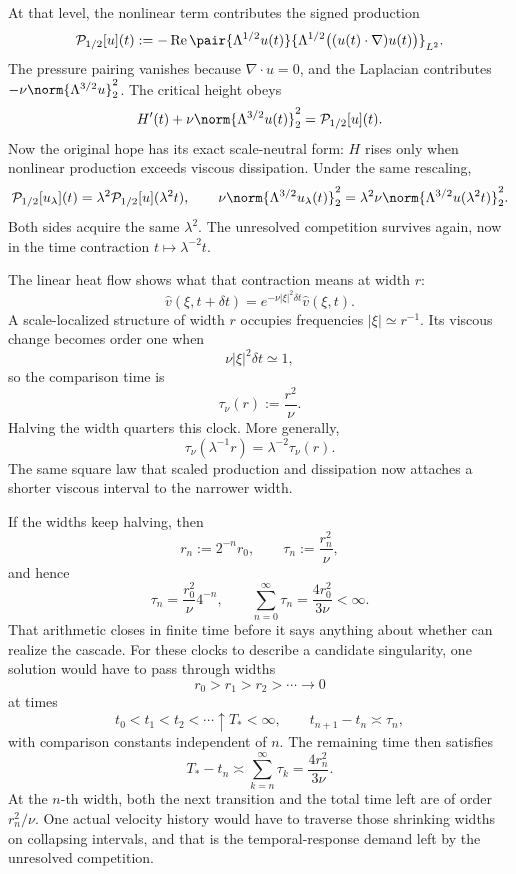 
At that level, the nonlinear term contributes the signed production
\[
  \mathcal P_{1/2}[u](t)
  :=
  -\operatorname{Re}
  \pair
    {\Lambda^{1/2}u(t)}
    {\Lambda^{1/2}\bigl((u(t)\cdot\nabla)u(t)\bigr)}_{L^2}.
\]
The pressure pairing vanishes because \(\nabla\cdot u=0\), and the Laplacian contributes \(-\nu\norm{\Lambda^{3/2}u}_2^2\). The critical height obeys
\[
  H'(t)
  +
  \nu\norm{\Lambda^{3/2}u(t)}_2^2
  =
  \mathcal P_{1/2}[u](t).
\]
Now the original hope has its exact scale-neutral form: \(H\) rises only when nonlinear production exceeds viscous dissipation. Under the same rescaling,
\[
  \mathcal P_{1/2}[u_\lambda](t)
  =
  \lambda^2\mathcal P_{1/2}[u](\lambda^2t),
  \qquad
  \nu\norm{\Lambda^{3/2}u_\lambda(t)}_2^2
  =
  \lambda^2\nu\norm{\Lambda^{3/2}u(\lambda^2t)}_2^2.
\]
Both sides acquire the same \(\lambda^2\). The unresolved competition survives again, now in the time contraction \(t\mapsto\lambda^{-2}t\).


The linear heat flow shows what that contraction means at width \(r\):
\[
  \widehat v(\xi,t+\delta t)
  =
  e^{-\nu|\xi|^2\delta t}\widehat v(\xi,t).
\]
A scale-localized structure of width \(r\) occupies frequencies \(|\xi|\simeq r^{-1}\). Its viscous change becomes order one when
\[
  \nu|\xi|^2\delta t\simeq1,
\]
so the comparison time is
\[
  \tau_\nu(r)
  :=
  \frac{r^2}{\nu}.
\]
Halving the width quarters this clock. More generally,
\[
  \tau_\nu(\lambda^{-1}r)
  =
  \lambda^{-2}\tau_\nu(r).
\]
The same square law that scaled production and dissipation now attaches a shorter viscous interval to the narrower width.


If the widths keep halving, then
\[
  r_n:=2^{-n}r_0,
  \qquad
  \tau_n:=\frac{r_n^2}{\nu},
\]
and hence
\[
  \tau_n
  =
  \frac{r_0^2}{\nu}4^{-n},
  \qquad
  \sum_{n=0}^{\infty}\tau_n
  =
  \frac{4r_0^2}{3\nu}
  <
  \infty.
\]
That arithmetic closes in finite time before it says anything about whether \NavierStokes{} can realize the cascade. For these clocks to describe a candidate singularity, one \NavierStokes{} solution would have to pass through widths
\[
  r_0>r_1>r_2>\cdots\longrightarrow0
\]
at times
\[
  t_0<t_1<t_2<\cdots\uparrow T_*<\infty,
  \qquad
  t_{n+1}-t_n\asymp\tau_n,
\]
with comparison constants independent of \(n\). The remaining time then satisfies
\[
  T_*-t_n
  \asymp
  \sum_{k=n}^{\infty}\tau_k
  =
  \frac{4r_n^2}{3\nu}.
\]
At the \(n\)-th width, both the next transition and the total time left are of order \(r_n^2/\nu\). One actual velocity history would have to traverse those shrinking widths on collapsing intervals, and that is the temporal-response demand left by the unresolved competition.
